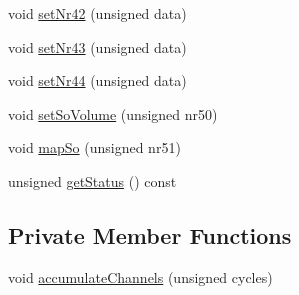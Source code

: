 \begin{DoxyCompactItemize}
\item 
void \hyperlink{classgambatte_1_1PSG_a32f0dd0a45a9c04159e3e88a6c17054b}{set\+Nr42} (unsigned data)
\item 
void \hyperlink{classgambatte_1_1PSG_a972c8258d37f53c8f8230e22a33a2b6a}{set\+Nr43} (unsigned data)
\item 
void \hyperlink{classgambatte_1_1PSG_afadec4850285859a754b54293dc63dae}{set\+Nr44} (unsigned data)
\item 
void \hyperlink{classgambatte_1_1PSG_a1ba6821cfba1fb002235458fae888063}{set\+So\+Volume} (unsigned nr50)
\item 
void \hyperlink{classgambatte_1_1PSG_a32c30ebd36d8ddce3cbfac37ff8f7bb8}{map\+So} (unsigned nr51)
\item 
unsigned \hyperlink{classgambatte_1_1PSG_acff5df78e01094cc1736302a069ad208}{get\+Status} () const
\end{DoxyCompactItemize}
\subsection*{Private Member Functions}
\begin{DoxyCompactItemize}
\item 
void \hyperlink{classgambatte_1_1PSG_a9c4410f6f9f7f2a3eb3744cebd961bca}{accumulate\+Channels} (unsigned cycles)
\end{DoxyCompactItemize}
